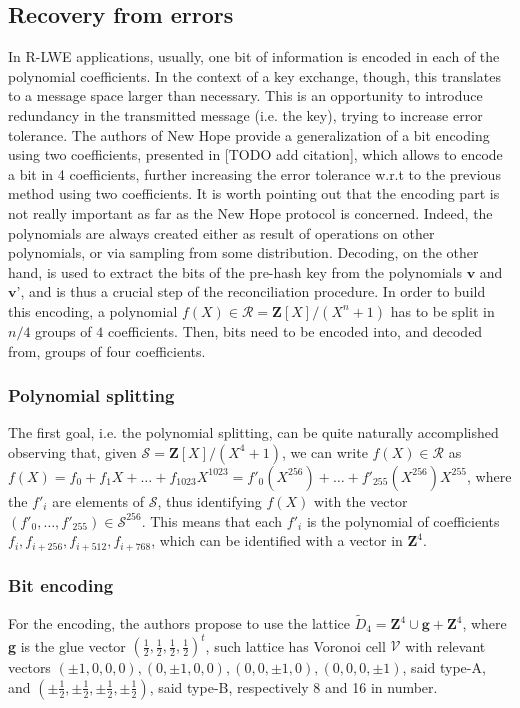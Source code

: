 \subsection{Recovery from errors}
In R-LWE applications, usually, one bit of information is encoded in each of the polynomial coefficients. In the context of a key exchange, though, this translates to a message space larger than necessary. This is an opportunity to introduce redundancy in the transmitted message (i.e. the key), trying to increase error tolerance. The authors of New Hope provide a generalization of a bit encoding using two coefficients, presented in [TODO add citation], which allows to encode a bit in 4 coefficients, further increasing the error tolerance w.r.t to the previous method using two coefficients. It is worth pointing out that the encoding part is not really important as far as the New Hope protocol is concerned. Indeed, the polynomials are always created either as result of operations on other polynomials, or via sampling from some distribution. Decoding, on the other hand, is used to extract the bits of the pre-hash key from the polynomials $\textbf{v}$ and $\textbf{v'}$, and is thus a crucial step of the reconciliation procedure. In order to build this encoding, a polynomial $f(X) \in \mathscr{R} = \mathbf{Z}[X]/(X^n+1)$ has to be split in $n/4$ groups of $4$ coefficients. Then, bits need to be encoded into, and decoded from, groups of four coefficients.

\subsubsection{Polynomial splitting}
The first goal, i.e. the polynomial splitting, can be quite naturally accomplished observing that, given $\mathscr{S} = \mathbf{Z}[X]/(X^4+1)$, we can write $f(X) \in \mathscr{R}$ as $f(X) = f_0 + f_1X + \ldots + f_{1023}X^{1023} = f'_0(X^{256}) + \ldots + f'_{255}(X^{256})X^{255}$, where the $f'_i$ are elements of $\mathscr{S}$, thus identifying $f(X)$ with the vector $(f'_0,\ldots,f'_{255}) \in \mathscr{S}^{256}$. This means that each $f'_i$ is the polynomial of coefficients $f_i,f_{i+256},f_{i+512},f_{i+768}$, which can be identified with a vector in $\mathbf{Z}^4$.

\subsubsection{Bit encoding}
For the encoding, the authors propose to use the lattice $\tilde{D}_4 = \mathbf{Z}^4 \cup \mathbf{g} + \mathbf{Z}^4$, where \textbf{g} is the glue vector $(\frac{1}{2},\frac{1}{2},\frac{1}{2},\frac{1}{2})^t$, such lattice has Voronoi cell $\mathscr{V}$ with relevant vectors $(\pm1,0,0,0),(0,\pm1,0,0),(0,0,\pm1,0),(0,0,0,\pm1)$, said type-A, and $(\pm\frac{1}{2},\pm\frac{1}{2},\pm\frac{1}{2},\pm\frac{1}{2})$, said type-B, respectively 8 and 16 in number.

